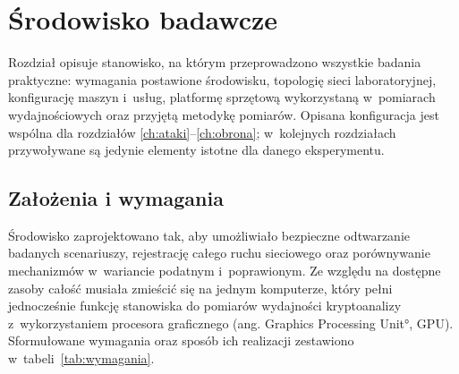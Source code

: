\chapter{Środowisko badawcze}\label{ch:srodowisko}

Rozdział opisuje stanowisko, na którym przeprowadzono wszystkie badania praktyczne: wymagania postawione środowisku, topologię sieci laboratoryjnej, konfigurację maszyn i~usług, platformę sprzętową wykorzystaną w~pomiarach wydajnościowych oraz przyjętą metodykę pomiarów. Opisana konfiguracja jest wspólna dla rozdziałów \ref{ch:ataki}--\ref{ch:obrona}; w~kolejnych rozdziałach przywoływane są jedynie elementy istotne dla danego eksperymentu.

\section{Założenia i wymagania}\label{sec:wymagania}

Środowisko zaprojektowano tak, aby umożliwiało bezpieczne odtwarzanie badanych scenariuszy, rejestrację całego ruchu sieciowego oraz porównywanie mechanizmów w~wariancie podatnym i~poprawionym. Ze względu na dostępne zasoby całość musiała zmieścić się na jednym komputerze, który pełni jednocześnie funkcję stanowiska do pomiarów wydajności kryptoanalizy z~wykorzystaniem procesora graficznego (ang. \ang{Graphics Processing Unit}, GPU). Sformułowane wymagania oraz sposób ich realizacji zestawiono w~tabeli~\ref{tab:wymagania}.

